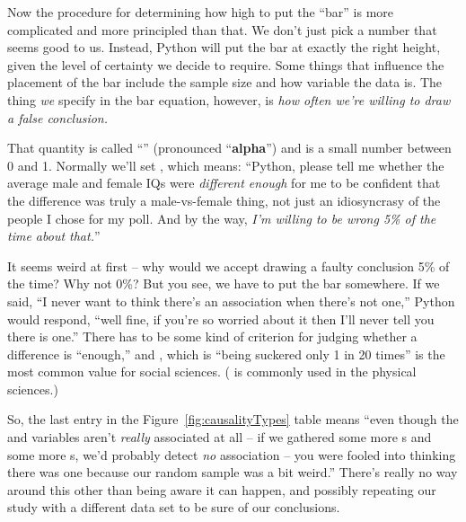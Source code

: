 \label{alpha}

Now the procedure for determining how high to put the ``bar'' is more
complicated and more principled than that. We don't just pick a number that
seems good to us. Instead, Python will put the bar at exactly the right height,
given the level of certainty we decide to require. Some things that influence
the placement of the bar include the sample size and how variable the data is.
The thing \textit{we} specify in the bar equation, however, is \textit{how
often we're willing to draw a false conclusion.}


That quantity is called ``'' (pronounced
``\textbf{alpha}'') and is a small number between 0 and 1. Normally we'll set
, which means: ``Python, please tell me whether the average male
and female IQs were \textit{different enough} for me to be confident that the
difference was truly a male-vs-female thing, not just an idiosyncrasy of the
people I chose for my poll. And by the way, \textit{I'm willing to be wrong 5\%
of the time about that.}''

It seems weird at first -- why would we accept drawing a faulty conclusion 5\%
of the time? Why not 0\%? But you see, we have to put the bar somewhere. If we
said, ``I never want to think there's an association when there's not one,''
Python would respond, ``well fine, if you're so worried about it then I'll
never tell you there is one.'' There has to be some kind of criterion for
judging whether a difference is ``enough,'' and , which is ``being
suckered only 1 in 20 times'' is the most common value for social sciences.
( is commonly used in the physical sciences.)

So, the last entry in the Figure~\ref{fig:causalityTypes} table means ``even
though the  and  variables aren't \textit{really} associated at all -- if
we gathered some more s and some more s, we'd probably detect \textit{no}
association -- you were fooled into thinking there was one because our random
sample was a bit weird.'' There's really no way around this other than being
aware it can happen, and possibly repeating our study with a different data
set to be sure of our conclusions.
